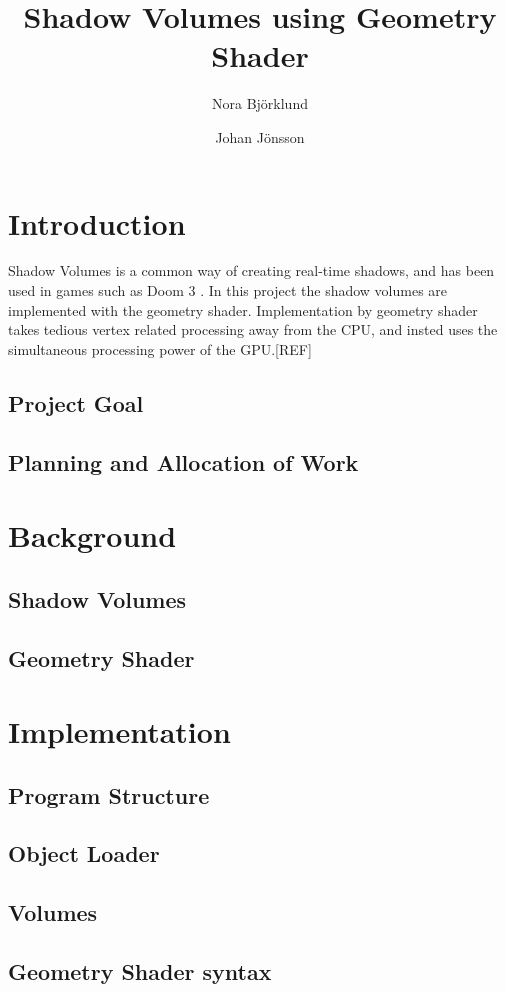 \documentclass[a4paper, 12pt]{article}
\title{Shadow Volumes using Geometry Shader}
\author{Nora Björklund \and Johan Jönsson}
\begin{document}
\maketitle
\tableofcontents
\newpage
\section{Introduction}
Shadow Volumes is a common way of creating real-time shadows, and has been used
in games such as Doom 3 \cite{gpug1}. In this project the shadow volumes are implemented with the geometry shader. Implementation by geometry shader takes tedious vertex related processing away from the CPU, and insted uses the simultaneous processing power of the GPU.[REF]
\subsection{Project Goal}
\subsection{Planning and Allocation of Work}
\section{Background}
\subsection{Shadow Volumes}
\subsection{Geometry Shader}
\section{Implementation}
\subsection{Program Structure}
\subsection{Object Loader}
\subsection{Volumes}
\subsection{Geometry Shader syntax}
\end{document}
